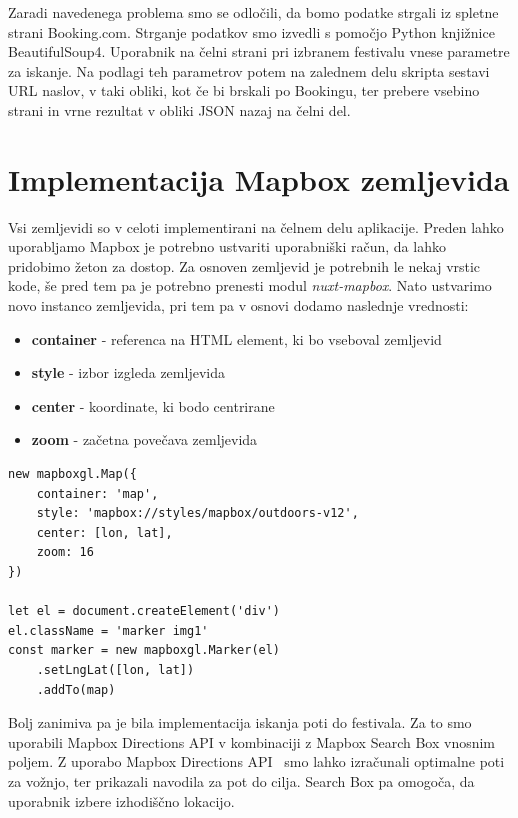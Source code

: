 \documentclass[a4paper,12pt,openright]{book}
\begin{document}
Zaradi navedenega problema smo se odločili, da bomo podatke strgali iz spletne strani Booking.com.
Strganje podatkov smo izvedli s pomočjo Python knjižnice BeautifulSoup4.
Uporabnik na čelni strani pri izbranem festivalu vnese parametre za iskanje.
Na podlagi teh parametrov potem na zalednem delu skripta sestavi URL naslov, v taki obliki, kot če bi brskali po Bookingu, ter prebere vsebino strani in vrne rezultat v obliki JSON nazaj na čelni del.

\section{Implementacija Mapbox zemljevida}
Vsi zemljevidi so v celoti implementirani na čelnem delu aplikacije.
Preden lahko uporabljamo Mapbox je potrebno ustvariti uporabniški račun, da lahko pridobimo žeton za dostop.
Za osnoven zemljevid je potrebnih le nekaj vrstic kode, še pred tem pa je potrebno prenesti modul \textit{nuxt-mapbox}.
Nato ustvarimo novo instanco zemljevida, pri tem pa v osnovi dodamo naslednje vrednosti:
\begin{itemize}
    \item \textbf{container} - referenca na HTML element, ki bo vseboval zemljevid

    \item \textbf{style} - izbor izgleda zemljevida

    \item \textbf{center} - koordinate, ki bodo centrirane

    \item \textbf{zoom} - začetna povečava zemljevida

\end{itemize}

\begin{lstlisting}[label=code4,caption=Primer kode za prikaz lokacije na Mapbox zemljevidu.,frame=tb,captionpos=b]
new mapboxgl.Map({
    container: 'map',
    style: 'mapbox://styles/mapbox/outdoors-v12',
    center: [lon, lat],
    zoom: 16
})

let el = document.createElement('div')
el.className = 'marker img1'
const marker = new mapboxgl.Marker(el)
    .setLngLat([lon, lat])
    .addTo(map)
\end{lstlisting}

Bolj zanimiva pa je bila implementacija iskanja poti do festivala.
Za to smo uporabili Mapbox Directions API v kombinaciji z Mapbox Search Box vnosnim poljem.
Z uporabo Mapbox Directions API~\cite{mapboxdirections} smo lahko izračunali optimalne poti za vožnjo, ter prikazali navodila za pot do cilja.
Search Box pa omogoča, da uporabnik izbere izhodiščno lokacijo.
\end{document}
